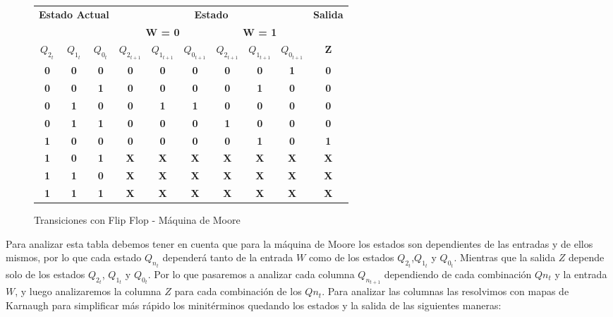 \documentclass[10pt,a4paper]{article}
\begin{document}
\begin{figure}[H]
	\begin{center}
		\begin{tabular}{|c|c|c|c|c|c|c|c|c|c|}
\hline
\multicolumn{3}{|c|}{\multirow{2}{*}{\textbf{Estado Actual}}} & \multicolumn{6}{c|}{\textbf{Estado}} & \multirow{2}{*}{\textbf{Salida}} \\ \cline{4-9}
\multicolumn{3}{|c|}{} & \multicolumn{3}{c|}{\textbf{W = 0}} & \multicolumn{3}{c|}{\textbf{W = 1}} &  \\ \hline
\textbf{$Q_{2_{t}}$} & \textbf{$Q_{1_{t}}$} & \textbf{$Q_{0_{t}}$} & \textbf{$Q_{2_{t+1}}$} & \textbf{$Q_{1_{t+1}}$} & \textbf{$Q_{0_{t+1}}$} & \textbf{$Q_{2_{t+1}}$} & \textbf{$Q_{1_{t+1}}$} & \textbf{$Q_{0_{t+1}}$} & \textbf{Z} \\ \hline
\textbf{0} & \textbf{0} & \textbf{0} & \textbf{0} & \textbf{0} & \textbf{0} & \textbf{0} & \textbf{0} & \textbf{1} & \textbf{0} \\ \hline
\textbf{0} & \textbf{0} & \textbf{1} & \textbf{0} & \textbf{0} & \textbf{0} & \textbf{0} & \textbf{1} & \textbf{0} & \textbf{0} \\ \hline
\textbf{0} & \textbf{1} & \textbf{0} & \textbf{0} & \textbf{1} & \textbf{1} & \textbf{0} & \textbf{0} & \textbf{0} & \textbf{0} \\ \hline
\textbf{0} & \textbf{1} & \textbf{1} & \textbf{0} & \textbf{0} & \textbf{0} & \textbf{1} & \textbf{0} & \textbf{0} & \textbf{0} \\ \hline
\textbf{1} & \textbf{0} & \textbf{0} & \textbf{0} & \textbf{0} & \textbf{0} & \textbf{0} & \textbf{1} & \textbf{0} & \textbf{1} \\ \hline
\textbf{1} & \textbf{0} & \textbf{1} & \textbf{X} & \textbf{X} & \textbf{X} & \textbf{X} & \textbf{X} & \textbf{X} & \textbf{X} \\ \hline
\textbf{1} & \textbf{1} & \textbf{0} & \textbf{X} & \textbf{X} & \textbf{X} & \textbf{X} & \textbf{X} & \textbf{X} & \textbf{X} \\ \hline
\textbf{1} & \textbf{1} & \textbf{1} & \textbf{X} & \textbf{X} & \textbf{X} & \textbf{X} & \textbf{X} & \textbf{X} & \textbf{X} \\ \hline
		\end{tabular}
		\caption{Transiciones con Flip Flop - Máquina de Moore} 
		\label{2_fig2}
	\end{center}
\end{figure}

Para analizar esta tabla debemos tener en cuenta que para la máquina de Moore los estados son dependientes de las entradas y de ellos mismos, por lo que cada estado $Q_{n_{t}}$ depender\'a tanto de la entrada $W$ como de los estados $Q_{2_{t}}$,$Q_{1_{t}}$ y $Q_{0_{t}}$. Mientras que la salida $Z$ depende solo de los estados $Q_{2_{t}}$, $Q_{1_{t}}$ y $Q_{0_{t}}$. Por lo que pasaremos a analizar cada columna $Q_{n_{t+1}}$ dependiendo de cada combinaci\'on $Q{n_{t}}$ y la entrada $W$, y luego analizaremos la columna $Z$ para cada combinaci\'on de los $Q{n_{t}}$. Para analizar las columnas las resolvimos con mapas de Karnaugh para simplificar más rápido los minit\'erminos quedando los estados y la salida de las siguientes maneras:
	
\end{document}
